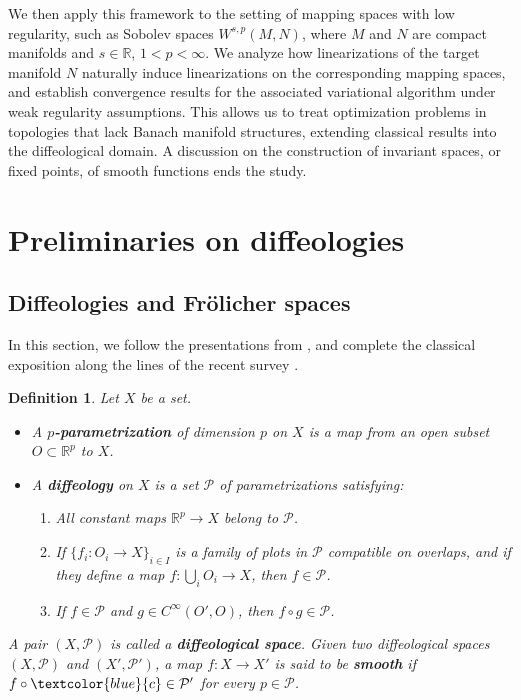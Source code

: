 \documentclass{amsart}
\def\R{\mathbb{R}}
\newcommand{\minor}[1]{\textcolor{blue}{#1}}
\newcounter{thm}
\newcounter{ex}
\newcounter{re}
\newtheorem{Definition}[thm]{Definition}
\begin{document}
We then apply this framework to the setting of mapping spaces with low regularity, such as Sobolev spaces \( W^{s,p}(M,N) \), where \( M \) and \( N \) are compact manifolds and \( s \in \mathbb{R} \), \( 1 < p < \infty \). We analyze how linearizations of the target manifold \( N \) naturally induce linearizations on the corresponding mapping spaces, and establish convergence results for the associated variational algorithm under weak regularity assumptions. This allows us to treat optimization problems in topologies that lack Banach manifold structures, extending classical results into the diffeological domain. A discussion on the construction of invariant spaces, or fixed points, of smooth functions ends the study.

\section{Preliminaries on diffeologies}
\subsection{Diffeologies and Fr\"olicher spaces}

In this section, we follow the presentations from \cite{Ma2013, MR2016}, and complete the classical exposition \cite{Igdiff} along the lines of the recent survey \cite{GMW2023}. 

\begin{Definition}
	Let $X$ be a set.
	
	\begin{itemize}
		\item A \textbf{$p$-parametrization} of dimension $p$ on $X$ is a map from an open subset $O \subset \R^p$ to $X$.
		
		\item A \textbf{diffeology} on $X$ is a set $\mathcal{P}$ of parametrizations satisfying:
		\begin{enumerate}
			\item All constant maps $\R^p \to X$ belong to $\mathcal{P}$.
			\item If $\{f_i: O_i \to X\}_{i \in I}$ is a family of plots in $\mathcal{P}$ compatible on overlaps, and if they define a map $f: \bigcup_{i} O_i \to X$, then $f \in \mathcal{P}$.
			\item If $f \in \mathcal{P}$ and $g \in C^\infty(O', O)$, then $f \circ g \in \mathcal{P}$.
		\end{enumerate}
	\end{itemize}
	
	A pair $(X, \mathcal{P})$ is called a \textbf{diffeological space}. Given two diffeological spaces $(X, \mathcal{P})$ and $(X', \mathcal{P}')$, a map $f: X \to X'$ is said to be \textbf{smooth} if $f\circ \minor{c} \in \mathcal{P}'$ for every $p \in \mathcal{P}$.
\end{Definition}
\end{document}

